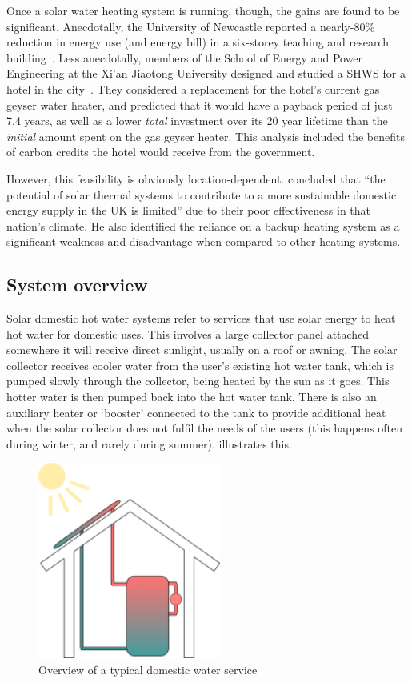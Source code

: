Once a solar water heating system is running, though, the gains are found to be significant.
Anecdotally, the University of Newcastle reported a nearly-80\% reduction in energy use (and energy bill) in a six-storey teaching and research building~\cite{ApricusNewcastle}.
Less anecdotally, members of the School of Energy and Power Engineering at the Xi'an Jiaotong University designed and studied a SHWS for a hotel in the city~\cite{Cao14}.
They considered a replacement for the hotel's current gas geyser water heater, and predicted that it would have a payback period of just 7.4 years, as well as a lower \emph{total} investment over its 20 year lifetime than the \emph{initial} amount spent on the gas geyser heater.
This analysis included the benefits of carbon credits the hotel would receive from the government.

However, this feasibility is obviously location-dependent.
\textcite{Greening14} concluded that ``the potential of solar thermal systems to contribute to a more sustainable domestic energy supply in the UK is limited'' due to their poor effectiveness in that nation's climate.
He also identified the reliance on a backup heating system as a significant weakness and disadvantage when compared to other heating systems.

\subsection{System overview}
\label{sec:background:system}

Solar domestic hot water systems refer to services that use solar energy to heat hot water for domestic uses.
This involves a large collector panel attached somewhere it will receive direct sunlight, usually on a roof or awning.
The solar collector receives cooler water from the user's existing hot water tank, which is pumped slowly through the collector, being heated by the sun as it goes.
This hotter water is then pumped back into the hot water tank.
There is also an auxiliary heater or `booster' connected to the tank to provide additional heat when the solar collector does not fulfil the needs of the users (this happens often during winter, and rarely during summer).
 illustrates this.

\begin{figure}
   \centering
   \includegraphics[width=6cm]{images/house}
   \caption{Overview of a typical domestic water service}
   \label{fig:hot-water-service}
\end{figure}

